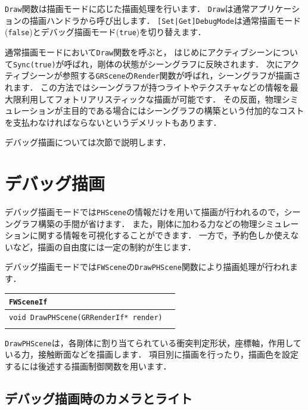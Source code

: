 \texttt{Draw}\KLUDGE 関数は描画モードに応じた描画処理を行います．
\texttt{Draw}\KLUDGE は通常アプリケーションの描画ハンドラから呼び出します．
\texttt{[Set|Get]DebugMode}\KLUDGE は通常描画モード(\texttt{false})\KLUDGE とデバッグ描画モード(\texttt{true})\KLUDGE を切り替えます．

\KLUDGE 通常描画モードにおいて\texttt{Draw}\KLUDGE 関数を呼ぶと，
\KLUDGE はじめにアクティブシーンについて\texttt{Sync(true)}\KLUDGE が呼ばれ，剛体の状態がシーングラフに反映されます．
\KLUDGE 次にアクティブシーンが参照する\texttt{GRScene}\KLUDGE の\texttt{Render}\KLUDGE 関数が呼ばれ，シーングラフが描画されます．
\KLUDGE この方法ではシーングラフが持つライトやテクスチャなどの情報を最大限利用してフォトリアリスティックな描画が可能です．
\KLUDGE その反面，物理シミュレーションが主目的である場合にはシーングラフの構築という付加的なコストを支払わなければならないというデメリットもあります．

\KLUDGE デバッグ描画については次節で説明します．

\section{\KLUDGE デバッグ描画}

\KLUDGE デバッグ描画モードでは\texttt{PHScene}\KLUDGE の情報だけを用いて描画が行われるので，シーングラフ構築の手間が省けます．
\KLUDGE また，剛体に加わる力などの物理シミュレーションに関する情報を可視化することができます．
\KLUDGE 一方で，予約色しか使えないなど，描画の自由度には一定の制約が生じます．

\KLUDGE デバッグ描画モードでは\texttt{FWScene}\KLUDGE の\texttt{DrawPHScene}\KLUDGE 関数により描画処理が行われます．

\noindent
\begin{tabular}{p{.7\hsize}p{.2\hsize}}
\\
\texttt{FWSceneIf}									\\ \midrule
\texttt{void DrawPHScene(GRRenderIf* render)}	&	\\
\\
\end{tabular}

\texttt{DrawPHScene}\KLUDGE は，各剛体に割り当てられている衝突判定形状，座標軸，作用している力，接触断面などを描画します．
\KLUDGE 項目別に描画を行ったり，描画色を設定するには後述する描画制御関数を用います．

\subsection*{\KLUDGE デバッグ描画時のカメラとライト}

